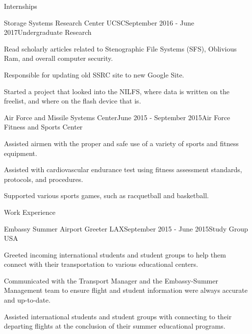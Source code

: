 \documentclass{resume} %
\begin{document}
\begin{rSection}{Internships}

\begin{rSubsection}{Storage Systems Research Center UCSC}{September 2016 - June 2017}{Undergraduate Research}{}
\item Read scholarly articles related to Stenographic File Systems (SFS), Oblivious Ram, and overall computer security.
\item Responsible for updating old SSRC site to new Google Site.
\item Started a project that looked into the NILFS, where data is written on the freelist, and where on the flash device that is.
\end{rSubsection}



\begin{rSubsection}{Air Force and Missile Systems Center}{June 2015 - September 2015}{Air Force Fitness and Sports Center}{}
\item Assisted airmen with the proper and safe use of a variety of sports and fitness equipment. 
\item Assisted with cardiovascular endurance test using fitness assessment standards, protocols, and procedures.
\item Supported various sports games, such as racquetball and basketball.
\end{rSubsection}

\end{rSection}



\begin{rSection}{Work Experience} \itemsep -2pt
\begin{rSubsection}{Embassy Summer Airport Greeter LAX}{September 2015 - June 2015}{Study Group USA}{}
\item Greeted incoming international students and student groups to help them connect with their transportation to various educational centers.
\item Communicated with the Transport Manager and the Embassy-Summer Management team to ensure flight and student information were always accurate and up-to-date.
\item Assisted international students and student groups with connecting to their departing flights at the conclusion of their summer educational programs.
\end{rSubsection}
  
\end{rSection}
\end{document}
